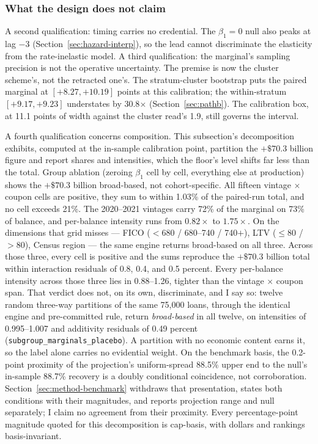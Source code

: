 \documentclass[12pt]{article}
\begin{document}
\subsubsection{What the design does not claim}

A second qualification: timing carries no credential. The $\beta_1 = 0$ null also peaks at lag $-3$ (Section~\ref{sec:hazard-interp}), so the lead cannot discriminate the elasticity from the rate-inelastic model. A third qualification: the marginal's sampling precision is not the operative uncertainty. The premise is now the cluster scheme's, not the retracted one's. The stratum-cluster bootstrap puts the paired marginal at $[+8.27, +10.19]$ points at this calibration; the within-stratum $[+9.17, +9.23]$ understates by 30.8$\times$ (Section~\ref{sec:pathb}). The calibration box, at 11.1 points of width against the cluster read's 1.9, still governs the interval.

A fourth qualification concerns composition. This subsection's decomposition exhibits, computed at the in-sample calibration point, partition the $+\$70.3$ billion figure and report shares and intensities, which the floor's level shifts far less than the total. Group ablation (zeroing $\beta_1$ cell by cell, everything else at production) shows the $+\$70.3$ billion broad-based, not cohort-specific. All fifteen vintage $\times$ coupon cells are positive, they sum to within 1.03\% of the paired-run total, and no cell exceeds 21\%. The 2020--2021 vintages carry 72\% of the marginal on 73\% of balance, and per-balance intensity runs from $0.82\times$ to $1.75\times$. On the dimensions that grid misses --- FICO ($<$680 / 680--740 / 740$+$), LTV ($\leq$80 / $>$80), Census region --- the same engine returns broad-based on all three. Across those three, every cell is positive and the sums reproduce the $+\$70.3$ billion total within interaction residuals of 0.8, 0.4, and 0.5 percent. Every per-balance intensity across those three lies in 0.88--1.26, tighter than the vintage $\times$ coupon span. That verdict does not, on its own, discriminate, and I say so: twelve random three-way partitions of the same 75,000 loans, through the identical engine and pre-committed rule, return \emph{broad-based} in all twelve, on intensities of 0.995--1.007 and additivity residuals of 0.49 percent (\texttt{subgroup\_marginals\_placebo}). A partition with no economic content earns it, so the label alone carries no evidential weight. On the benchmark basis, the 0.2-point proximity of the projection's uniform-spread 88.5\% upper end to the null's in-sample 88.7\% recovery is a doubly conditional coincidence, not corroboration. Section~\ref{sec:method-benchmark} withdraws that presentation, states both conditions with their magnitudes, and reports projection range and null separately; I claim no agreement from their proximity. Every percentage-point magnitude quoted for this decomposition is cap-basis, with dollars and rankings basis-invariant.
\end{document}
